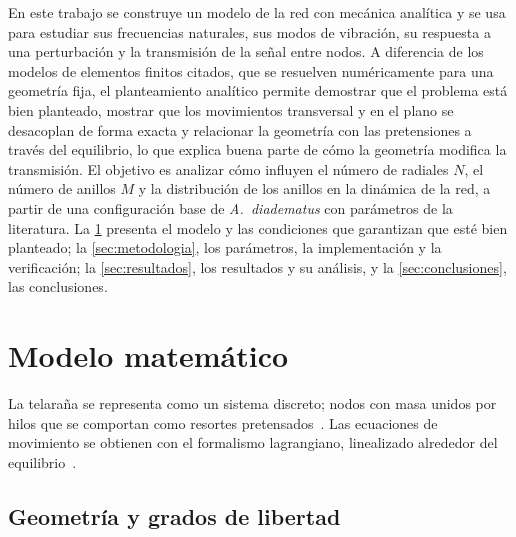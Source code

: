 \documentclass[fleqn,final]{jaes}
\begin{document}
En este trabajo se construye un modelo de la red con mecánica analítica y se usa para estudiar sus frecuencias naturales, sus modos de vibración, su respuesta a una perturbación y la transmisión de la señal entre nodos. A diferencia de los modelos de elementos finitos citados, que se resuelven numéricamente para una geometría fija, el planteamiento analítico permite demostrar que el problema está bien planteado, mostrar que los movimientos transversal y en el plano se desacoplan de forma exacta y relacionar la geometría con las pretensiones a través del equilibrio, lo que explica buena parte de cómo la geometría modifica la transmisión. El objetivo es analizar cómo influyen el número de radiales $N$, el número de anillos $M$ y la distribución de los anillos en la dinámica de la red, a partir de una configuración base de \textit{A.~diadematus} con parámetros de la literatura. La \cref{sec:modelo} presenta el modelo y las condiciones que garantizan que esté bien planteado; la \cref{sec:metodologia}, los parámetros, la implementación y la verificación; la \cref{sec:resultados}, los resultados y su análisis, y la \cref{sec:conclusiones}, las conclusiones.

\section{Modelo matemático}\label{sec:modelo}

La telaraña se representa como un sistema discreto; nodos con masa unidos por hilos que se comportan como resortes pretensados~\cite{aoyanagi2010}. Las ecuaciones de movimiento se obtienen con el formalismo lagrangiano, linealizado alrededor del equilibrio~\cite{goldstein2002,meirovitch2001}.

\subsection{Geometría y grados de libertad}
\end{document}
